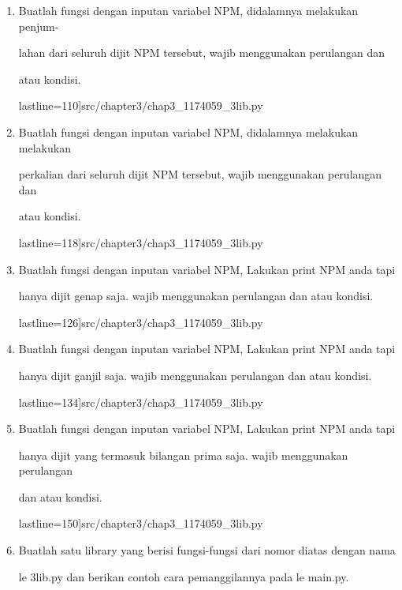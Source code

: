 \begin{enumerate}
    \item Buatlah fungsi dengan inputan variabel NPM, didalamnya melakukan penjum-

    lahan dari seluruh dijit NPM tersebut, wajib menggunakan perulangan dan

    atau kondisi.

 lastline=110]{src/chapter3/chap3_1174059_3lib.py}



    \item Buatlah fungsi dengan inputan variabel NPM, didalamnya melakukan melakukan

    perkalian dari seluruh dijit NPM tersebut, wajib menggunakan perulangan dan

    atau kondisi.

 lastline=118]{src/chapter3/chap3_1174059_3lib.py}



    \item Buatlah fungsi dengan inputan variabel NPM, Lakukan print NPM anda tapi

    hanya dijit genap saja. wajib menggunakan perulangan dan atau kondisi.

 lastline=126]{src/chapter3/chap3_1174059_3lib.py}



    \item Buatlah fungsi dengan inputan variabel NPM, Lakukan print NPM anda tapi

    hanya dijit ganjil saja. wajib menggunakan perulangan dan atau kondisi.

 lastline=134]{src/chapter3/chap3_1174059_3lib.py}



    \item Buatlah fungsi dengan inputan variabel NPM, Lakukan print NPM anda tapi

    hanya dijit yang termasuk bilangan prima saja. wajib menggunakan perulangan

    dan atau kondisi.

    lastline=150]{src/chapter3/chap3_1174059_3lib.py}



    \item Buatlah satu library yang berisi fungsi-fungsi dari nomor diatas dengan nama

    
le 3lib.py dan berikan contoh cara pemanggilannya pada 
le main.py.


\end{enumerate}
